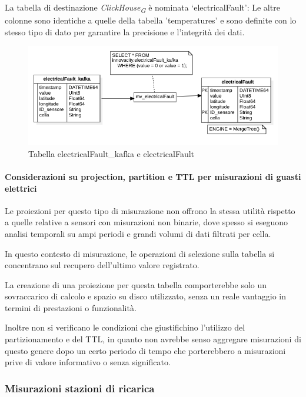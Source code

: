 La tabella di destinazione \textit{ClickHouse}\textsubscript{\textit{G}} è nominata ‘electricalFault’:
Le altre colonne sono identiche a quelle della tabella 'temperatures' e sono definite con lo stesso tipo di dato per garantire la precisione e l'integrità dei dati.

\begin{figure}[H]
    \centering
    \includegraphics[width=1\textwidth]{../Images/SpecificaTecnica/electricalFault.png}
    \caption{Tabella electricalFault\_kafka e electricalFault}
    \label{fig:electricalFault_tables}
\end{figure}

\paragraph{Considerazioni su projection, partition e TTL per misurazioni di guasti elettrici} 
Le proiezioni per questo tipo di misurazione non offrono la stessa utilità rispetto a quelle relative a sensori con misurazioni non binarie, dove spesso si eseguono analisi temporali su ampi periodi e grandi volumi di dati filtrati per cella.

In questo contesto di misurazione, le operazioni di selezione sulla tabella si concentrano sul recupero dell'ultimo valore registrato.

La creazione di una proiezione per questa tabella comporterebbe solo un sovraccarico di calcolo e spazio su disco utilizzato, senza un reale vantaggio in termini di prestazioni o funzionalità.

Inoltre non si verificano le condizioni che giustifichino l'utilizzo del partizionamento e del TTL, in quanto non avrebbe senso aggregare misurazioni di questo genere dopo un certo periodo di tempo che porterebbero a misurazioni prive di valore informativo o senza significato.

\subsubsection{Misurazioni stazioni di ricarica}

